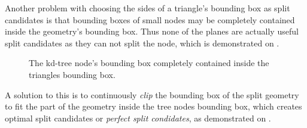 Another problem with choosing the sides of a triangle's bounding box
as split candidates is that bounding boxes of small nodes may be
completely contained inside the geometry's bounding box. Thus none of
the planes are actually useful split candidates as they can not split
the node, which is demonstrated on .

\begin{figure}
  \centering
    
  \vspace{3mm}
  \parbox{5cm}{\caption[A tree node's bounding box contained in a
      triangle's bounding box.]{The kd-tree node's bounding box
      completely contained inside the triangles bounding
      box.}\label{fig:aabbContained}}
\end{figure}

A solution to this is to continuously \textit{clip} the bounding box of the
split geometry to fit the part of the geometry inside the tree nodes bounding
box, which creates optimal split candidates or \textit{perfect split
  condidates}, as demonstrated on .

